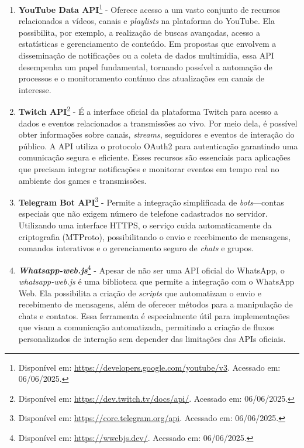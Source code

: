 \begin{enumerate}
    \item \textbf{YouTube Data API}\footnote{Disponível em: \url{https://developers.google.com/youtube/v3}. Acessado em: 06/06/2025.} - Oferece acesso a um vasto conjunto de recursos relacionados a vídeos, canais e \textit{playlists} na plataforma do YouTube. Ela possibilita, por exemplo, a realização de buscas avançadas, acesso a estatísticas e gerenciamento de conteúdo. Em propostas que envolvem a disseminação de notificações ou a coleta de dados multimídia, essa API desempenha um papel fundamental, tornando possível a automação de processos e o monitoramento contínuo das atualizações em canais de interesse.
    \par\vspace{0.25\baselineskip}
    
    \item \textbf{Twitch API}\footnote{Disponível em: \url{https://dev.twitch.tv/docs/api/}. Acessado em: 06/06/2025.} - É a interface oficial da plataforma Twitch para acesso a dados e eventos relacionados a transmissões ao vivo. Por meio dela, é possível obter informações sobre canais, \textit{streams}, seguidores e eventos de interação do público. A API utiliza o protocolo OAuth2 para autenticação garantindo uma comunicação segura e eficiente. Esses recursos são essenciais para aplicações que precisam integrar notificações e monitorar eventos em tempo real no ambiente dos games e transmissões.
    \par\vspace{0.25\baselineskip}
    
    \item \textbf{Telegram Bot API}\footnote{Disponível em: \url{https://core.telegram.org/api}. Acessado em: 06/06/2025.} - Permite a integração simplificada de \textit{bots}—contas especiais que não exigem número de telefone cadastrados no servidor. Utilizando uma interface HTTPS, o serviço cuida automaticamente da criptografia (MTProto), possibilitando o envio e recebimento de mensagens, comandos interativos e o gerenciamento seguro de \textit{chats} e grupos.
    \par\vspace{0.25\baselineskip}
    
    \item \textbf{\textit{Whatsapp-web.js}}\footnote{Disponível em: \url{https://wwebjs.dev/}. Acessado em: 06/06/2025.} - Apesar de não ser uma API oficial do WhatsApp, o \textit{whatsapp-web.js} é uma biblioteca que permite a integração com o WhatsApp Web. Ela possibilita a criação de \textit{scripts} que automatizam o envio e recebimento de mensagens, além de oferecer métodos para a manipulação de chats e contatos. Essa ferramenta é especialmente útil para implementações que visam a comunicação automatizada, permitindo a criação de fluxos personalizados de interação sem depender das limitações das APIs oficiais.
    \par\vspace{0.25\baselineskip}  
    

\end{enumerate}
